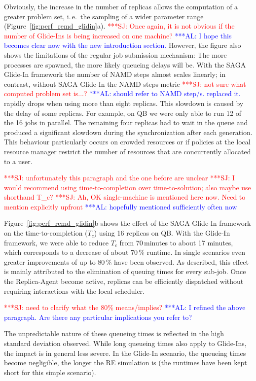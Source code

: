 \documentclass{rspublic}
\newcommand{\alnote}[1]{ {\textcolor{blue} { ***AL: #1 }}}
\newcommand{\jhanote}[1]{ {\textcolor{red} { ***SJ: #1 }}}
\newcommand{\alnote}[1]{}
\newcommand{\jhanote}[1]{}
\begin{document}
Obviously, the increase in the number of replicas allows the
computation of a greater problem set, i.\,e.\ the sampling of a wider
parameter range (Figure~\ref{fig:perf_remd_glidin}a).  \jhanote{Once
  again, it is not obvious if the number of Glide-Ins is being
  increased on one machine?}  \alnote{I hope this becomes clear now
  with the new introduction section.}  However, the figure also shows
the limitations of the regular job submission mechanism: The more
processes are spawned, the more likely queueing delays will be.  With
the SAGA Glide-In framework the number of NAMD steps almost scales
linearly; in contrast, without SAGA Glide-In the NAMD steps metric
\jhanote{not sure what computed  problem set is...?} 
\alnote{should refer to NAMD step/s. replaced it.}
rapidly drops when using more than eight
replicas. This slowdown is caused by the delay of some replicas.  For
example, on QB we were only able to run 12 of the 16 jobs in parallel.
The remaining four replicas had to wait in the queue and produced a
significant slowdown during the synchronization after each generation.
This behaviour particularly occurs on crowded resources or if policies
at the local resource manager restrict the number of resources that
are concurrently allocated to a user.

\jhanote{unfortunately this paragraph and the one before are unclear}
\jhanote{I would recommend using time-to-completion over
  time-to-solution; also maybe use shorthand T\_c?}  \jhanote{Ah, OK
  single-machine is mentioned here now. Need to mention explicitly
  upfront} \alnote{hopefully mentioned sufficiently often now}

Figure~\ref{fig:perf_remd_glidin}b shows the effect of the SAGA
Glide-In framework on the time-to-completion ($T_{c}$) using 16
replicas on QB.  With the Glide-In framework, we were able to reduce
$T_{c}$ from 70\,minutes to about 17 minutes, which corresponds to a
decrease of about 70\,\% runtime.  In single scenarios even greater
improvements of up to 80\,\% have been observed. As described, this
effect is mainly attributed to the elimination of queuing times for
every sub-job. Once the Replica-Agent become active, replicas can be
efficiently dispatched without requiring interactions with the local
scheduler.

\jhanote{need to clarify what the 80\% means/implies?} \alnote{I refined the above
paragraph. Are there any particular implications you refer to?}

The unpredictable nature of these queueing times is reflected in the
high standard deviation observed. While long queueing times also apply
to Glide-Ins, the impact is in general less severe.  In the Glide-In
scenario, the queueing times become negligible, the longer the RE
simulation is (the runtimes have been kept short for this simple
scenario).
\end{document}
